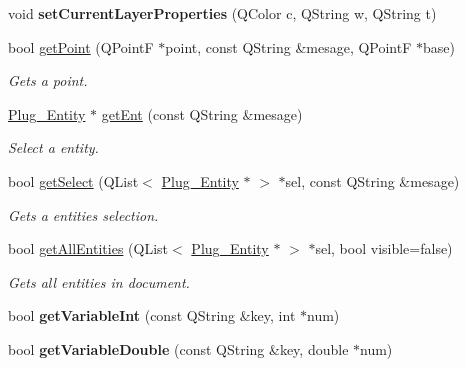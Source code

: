 \begin{DoxyCompactItemize}
\item 
\hypertarget{classDoc__plugin__interface_a10aba2f5db7056454801cac38e7a0e67}{void {\bfseries set\-Current\-Layer\-Properties} (Q\-Color c, Q\-String w, Q\-String t)}\label{classDoc__plugin__interface_a10aba2f5db7056454801cac38e7a0e67}

\item 
bool \hyperlink{classDoc__plugin__interface_a3d9ea0ef32825e0030cf38e327140a1b}{get\-Point} (Q\-Point\-F $\ast$point, const Q\-String \&mesage, Q\-Point\-F $\ast$base)
\begin{DoxyCompactList}\small\item\em Gets a point. \end{DoxyCompactList}\item 
\hyperlink{classPlug__Entity}{Plug\-\_\-\-Entity} $\ast$ \hyperlink{classDoc__plugin__interface_a99b59fe345fa16466fa55183e0b32a04}{get\-Ent} (const Q\-String \&mesage)
\begin{DoxyCompactList}\small\item\em Select a entity. \end{DoxyCompactList}\item 
bool \hyperlink{classDoc__plugin__interface_a2bca94ce4385bf1ba8a16b4ae2a0f290}{get\-Select} (Q\-List$<$ \hyperlink{classPlug__Entity}{Plug\-\_\-\-Entity} $\ast$ $>$ $\ast$sel, const Q\-String \&mesage)
\begin{DoxyCompactList}\small\item\em Gets a entities selection. \end{DoxyCompactList}\item 
bool \hyperlink{classDoc__plugin__interface_a7982249790e43196c81f437f3ccc6081}{get\-All\-Entities} (Q\-List$<$ \hyperlink{classPlug__Entity}{Plug\-\_\-\-Entity} $\ast$ $>$ $\ast$sel, bool visible=false)
\begin{DoxyCompactList}\small\item\em Gets all entities in document. \end{DoxyCompactList}\item 
\hypertarget{classDoc__plugin__interface_a2dc73981f8cc16bf779dd825be63263d}{bool {\bfseries get\-Variable\-Int} (const Q\-String \&key, int $\ast$num)}\label{classDoc__plugin__interface_a2dc73981f8cc16bf779dd825be63263d}

\item 
\hypertarget{classDoc__plugin__interface_a91cc15c19d57d1194826df4385fb8463}{bool {\bfseries get\-Variable\-Double} (const Q\-String \&key, double $\ast$num)}\label{classDoc__plugin__interface_a91cc15c19d57d1194826df4385fb8463}


\end{DoxyCompactItemize}
